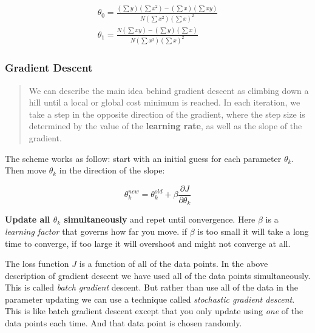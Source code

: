 \documentclass[11pt]{article}
\begin{document}
\begin{equation}
\begin{array}{lcl} 
\theta_0 = \frac{\left(\sum y \right) \left(\sum x^2 \right) -\left(\sum x \right) \left(\sum xy \right) }{N\left(\sum x^2 \right) \left(\sum x \right)^2 } 
\\ 
\theta_1 = \frac{N\left(\sum xy \right) - \left(\sum y \right)\left(\sum x \right)}{N\left(\sum x^2 \right) \left(\sum x \right)^2 }
\end{array}
\end{equation}

    \hypertarget{gradient-descent}{%
\subsubsection{Gradient Descent}\label{gradient-descent}}

\begin{quote}
We can describe the main idea behind gradient descent as climbing down a
hill until a local or global cost minimum is reached. In each iteration,
we take a step in the opposite direction of the gradient, where the step
size is determined by the value of the \textbf{learning rate}, as well
as the slope of the gradient.
\end{quote}

The scheme works as follow: start with an initial guess for each
parameter \(\theta_k\). Then move \(\theta_k\) in the direction of the
slope:

\begin{equation}
\theta_k^{new} =\theta_k^{old}+\beta \frac{\partial J}{\partial \theta_k}
\end{equation}

\textbf{Update all \(\theta_k\) simultaneously} and repet until
convergence. Here \(\beta\) is a \emph{learning factor} that governs how
far you move. if \(\beta\) is too small it will take a long time to
converge, if too large it will overshoot and might not converge at all.

The loss function \(J\) is a function of all of the data points. In the
above description of gradient descent we have used all of the data
points simultaneously. This is called \emph{batch gradient} descent. But
rather than use all of the data in the parameter updating we can use a
technique called \emph{stochastic gradient descent}. This is like batch
gradient descent except that you only update using \emph{one} of the
data points each time. And that data point is chosen randomly.
\end{document}

